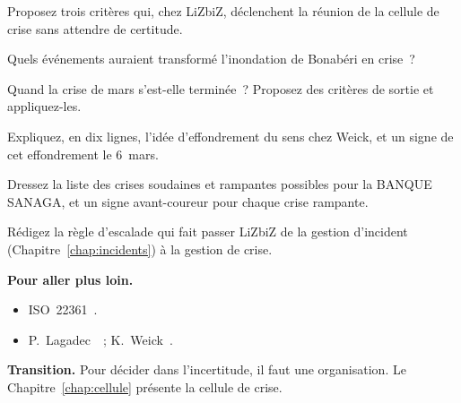 \begin{boxexo}[title={\ding{45}\quad Exercice~21.5. L'alerte \niveaumoyen}]
Proposez trois critères qui, chez LiZbiZ, déclenchent la réunion de la
cellule de crise sans attendre de certitude.
\end{boxexo}

\begin{boxexo}[title={\ding{45}\quad Exercice~21.6. MOUNGO en crise \niveaumoyen}]
Quels événements auraient transformé l'inondation de Bonabéri en crise~?
\end{boxexo}

\begin{boxexo}[title={\ding{45}\quad Exercice~21.7. La sortie \niveaumoyen}]
Quand la crise de mars s'est-elle terminée~? Proposez des critères de
sortie et appliquez-les.
\end{boxexo}

\begin{boxexo}[title={\ding{45}\quad Exercice~21.8. Mann Gulch \niveaumoyen}]
Expliquez, en dix lignes, l'idée d'effondrement du sens chez Weick, et un
signe de cet effondrement le 6~mars.
\end{boxexo}

\begin{boxexo}[title={\ding{45}\quad Exercice~21.9. Typologie bancaire \niveauexpert}]
Dressez la liste des crises soudaines et rampantes possibles pour la BANQUE
SANAGA, et un signe avant-coureur pour chaque crise rampante.
\end{boxexo}

\begin{boxexo}[title={\ding{45}\quad Exercice~21.10. Le seuil \niveauexpert}]
Rédigez la règle d'escalade qui fait passer LiZbiZ de la gestion
d'incident (Chapitre~\ref{chap:incidents}) à la gestion de crise.
\end{boxexo}

\bigskip

\begin{boxinfo}
\textbf{Pour aller plus loin.}
\begin{itemize}
    \item ISO~22361~\cite{iso22361_2022}.
    \item P.~Lagadec~\cite{lagadec1991}~; K.~Weick~\cite{weick1993}.
\end{itemize}
\end{boxinfo}

\begin{boxinfo}
\textbf{Transition.} Pour décider dans l'incertitude, il faut une
organisation. Le Chapitre~\ref{chap:cellule} présente la cellule de crise.
\end{boxinfo}
